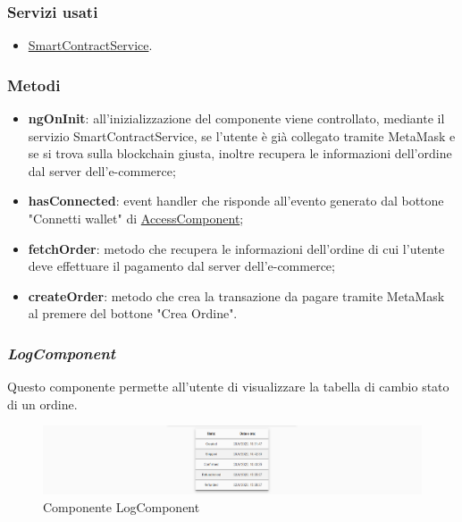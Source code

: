 \subsubsection{Servizi usati}
\begin{itemize}
    \item \hyperref[sec:smart-contract-service]{SmartContractService}.
\end{itemize}

\subsubsection{Metodi}
\begin{itemize}
    \item \textbf{ngOnInit}: all’inizializzazione del componente viene controllato, mediante il servizio SmartContractService, se l'utente è già collegato tramite MetaMask e se si trova sulla blockchain giusta, inoltre recupera le informazioni dell'ordine dal server dell'e-commerce;
    \item \textbf{hasConnected}: event handler che risponde all'evento generato dal bottone "Connetti wallet" di \hyperref[sec:access-component]{AccessComponent};
    \item \textbf{fetchOrder}: metodo che recupera le informazioni dell'ordine di cui l'utente deve effettuare il pagamento dal server dell'e-commerce;
    \item \textbf{createOrder}: metodo che crea la transazione da pagare tramite MetaMask al premere del bottone "Crea Ordine".
\end{itemize}

\newpage

\subsubsection*{\textit{LogComponent}}
\label{sec:log-component}
Questo componente permette all'utente di visualizzare la tabella di cambio stato di un ordine.

\begin{figure}[!h] 
    \centering 
    \includegraphics[width=1\columnwidth]{immagini/componenti/log.png} 
    \caption{Componente LogComponent}
\end{figure}

